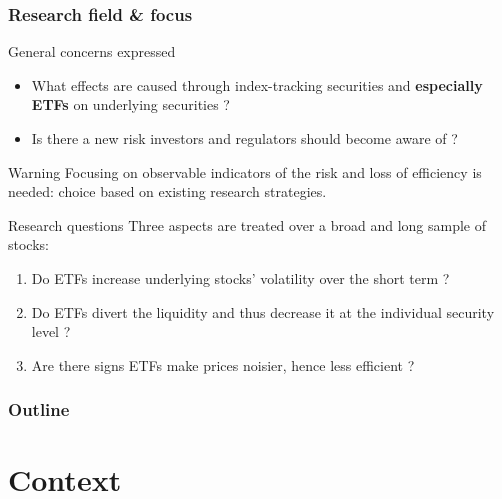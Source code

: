 \documentclass[handout, 9pt, usenames, dvipsnames]{beamer}
\begin{document}
\begin{frame}
  \frametitle{Research field \& focus}
  \begin{block}{General concerns expressed}
    \begin{itemize}
    \item What effects are caused through index-tracking securities and \textbf{especially ETFs} on underlying securities ?
    \item Is there a new risk investors and regulators should become aware of ?
    \end{itemize}
  \end{block}
  \begin{alertblock}{Warning}
    Focusing on observable indicators of the risk and loss of efficiency is needed: choice based on existing research strategies.
  \end{alertblock}
  \begin{exampleblock}{Research questions}
    Three aspects are treated over a broad and long sample of stocks:
    \begin{enumerate}
    \item<1-> Do ETFs increase underlying stocks' volatility over the short term ?
    \item<2-> Do ETFs divert the liquidity and thus decrease it at the individual security level ?
    \item<3-> Are there signs ETFs make prices noisier, hence less efficient ? 
    \end{enumerate}
  \end{exampleblock}
\end{frame}


\begin{frame}
  \frametitle{Outline}
  \tableofcontents
\end{frame}

\section{Context}
\end{document}
